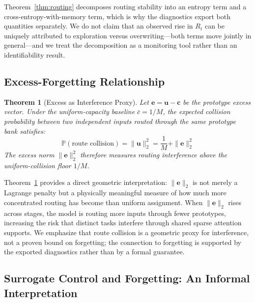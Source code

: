 \documentclass[11pt,a4paper]{article}
\newtheorem{theorem}{Theorem}[section]
\theoremstyle{definition}
\begin{document}
Theorem~\ref{thm:routing} decomposes routing stability into an entropy term and a cross-entropy-with-memory term, which is why the diagnostics export both quantities separately. We do not claim that an observed rise in $R_t$ can be uniquely attributed to exploration versus overwriting---both terms move jointly in general---and we treat the decomposition as a monitoring tool rather than an identifiability result.

\subsection{Excess-Forgetting Relationship}

\begin{theorem}[Excess as Interference Proxy]
\label{thm:excess}
Let $\mathbf{e} = \mathbf{u} - \mathbf{c}$ be the prototype excess vector. Under the uniform-capacity baseline $\bar{c} = 1/M$, the expected collision probability between two independent inputs routed through the same prototype bank satisfies:
\begin{equation}
\mathbb{P}(\text{route collision}) = \|\mathbf{u}\|_2^2 = \frac{1}{M} + \|\mathbf{e}\|_2^2
\end{equation}
The excess norm $\|\mathbf{e}\|_2^2$ therefore measures routing interference \textit{above} the uniform-collision floor $1/M$.
\end{theorem}

Theorem~\ref{thm:excess} provides a direct geometric interpretation: $\|\mathbf{e}\|_2$ is not merely a Lagrange penalty but a physically meaningful measure of how much more concentrated routing has become than uniform assignment. When $\|\mathbf{e}\|_2$ rises across stages, the model is routing more inputs through fewer prototypes, increasing the risk that distinct tasks interfere through shared sparse attention supports. We emphasize that route collision is a geometric proxy for interference, not a proven bound on forgetting; the connection to forgetting is supported by the exported diagnostics rather than by a formal guarantee.

\subsection{Surrogate Control and Forgetting: An Informal Interpretation}
\end{document}
